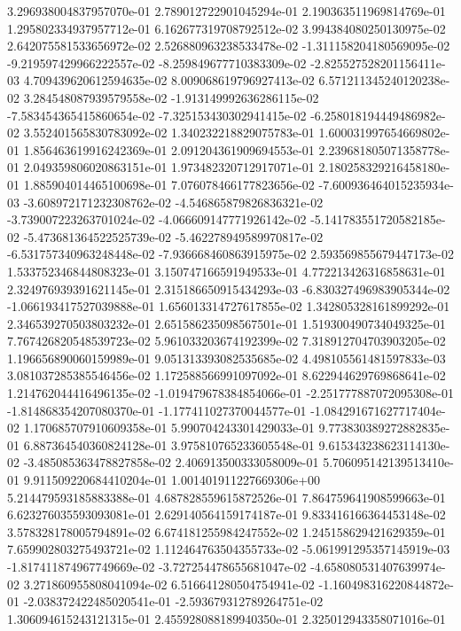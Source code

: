 3.296938004837957070e-01
2.789012722901045294e-01
2.190363511969814769e-01
1.295802334937957712e-01
6.162677319708792512e-02
3.994384080250130975e-02
2.642075581533656972e-02
2.526880963238533478e-02
-1.311158204180569095e-02
-9.219597429966222557e-02
-8.259849677710383309e-02
-2.825527528201156411e-03
4.709439620612594635e-02
8.009068619796927413e-02
6.571211345240120238e-02
3.284548087939579558e-02
-1.913149992636286115e-02
-7.583454365415860654e-02
-7.325153430302941415e-02
-6.258018194449486982e-02
3.552401565830783092e-02
1.340232218829075783e-01
1.600031997654669802e-01
1.856463619916242369e-01
2.091204361909694553e-01
2.239681805071358778e-01
2.049359806020863151e-01
1.973482320712917071e-01
2.180258329216458180e-01
1.885904014465100698e-01
7.076078466177823656e-02
-7.600936464015235934e-03
-3.608972171232308762e-02
-4.546865879826836321e-02
-3.739007223263701024e-02
-4.066609147771926142e-02
-5.141783551720582185e-02
-5.473681364522525739e-02
-5.462278949589970817e-02
-6.531757340963248448e-02
-7.936668460863915975e-02
2.593569855679447173e-02
1.533752346844808323e-01
3.150747166591949533e-01
4.772213426316858631e-01
2.324976939391621145e-01
2.315186650915434293e-03
-6.830327496983905344e-02
-1.066193417527039888e-01
1.656013314727617855e-02
1.342805328161899292e-01
2.346539270503803232e-01
2.651586235098567501e-01
1.519300490734049325e-01
7.767426820548539723e-02
5.961033203674192399e-02
7.318912704703903205e-02
1.196656890060159989e-01
9.051313393082535685e-02
4.498105561481597833e-03
3.081037285385546456e-02
1.172588566991097092e-01
8.622944629769868641e-02
1.214762044416496135e-02
-1.019479678384854066e-01
-2.251777887072095308e-01
-1.814868354207080370e-01
-1.177411027370044577e-01
-1.084291671627717404e-02
1.170685707910609358e-01
5.990704243301429033e-01
9.773830389272882835e-01
6.887364540360824128e-01
3.975810765233605548e-01
9.615343238623114130e-02
-3.485085363478827858e-02
2.406913500333058009e-01
5.706095142139513410e-01
9.911509220684410204e-01
1.001401911227669306e+00
5.214479593185883388e-01
4.687828559615872526e-01
7.864759641908599663e-01
6.623276035593093081e-01
2.629140564159174187e-01
9.833416166364453148e-02
3.578328178005794891e-02
6.674181255984247552e-02
1.245158629421629359e-01
7.659902803275493721e-02
1.112464763504355733e-02
-5.061991295357145919e-03
-1.817411874967749669e-02
-3.727254478655681047e-02
-4.658080531407639974e-02
3.271860955808041094e-02
6.516641280504754941e-02
-1.160498316220844872e-01
-2.038372422485020541e-01
-2.593679312789264751e-02
1.306094615243121315e-01
2.455928088189940350e-01
2.325012943358071016e-01
